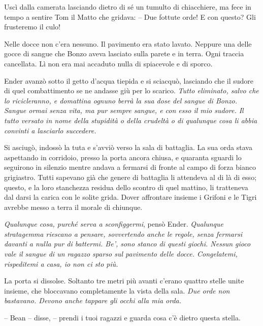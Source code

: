 {Uscì dalla camerata lasciando dietro di sé un tumulto di chiacchiere,
	ma fece in tempo a sentire Tom il Matto che gridava: -- Due fottute
	orde! E con questo? Gli frusteremo il culo!}

{Nelle docce non c'era nessuno. Il pavimento era stato lavato. Neppure
	una delle gocce di sangue che Bonzo aveva lasciato sulla parete e in
	terra. Ogni traccia cancellata. Lì non era mai accaduto nulla di
	spiacevole e di sporco.}

{Ender avanzò sotto il getto d'acqua tiepida e si sciacquò, lasciando
	che il sudore di quel combattimento se ne andasse giù per lo scarico.
	\emph{Tutto eliminato, salvo che lo ricicleranno, e domattina ognuno
		berrà la sua dose del sangue di Bonzo. Sangue ormai senza vita, ma pur
		sempre sangue, e con esso il mio sudore. Il tutto versato in nome della
		stupidità o della crudeltà o di qualunque cosa li abbia convinti a
		lasciarlo succedere.}}

{Si asciugò, indossò la tuta e s'avviò verso la sala di battaglia. La
	sua orda stava aspettando in corridoio, presso la porta ancora chiusa, e
	quaranta sguardi lo seguirono in silenzio mentre andava a fermarsi di
	fronte al campo di forza bianco grigiastro. Tutti sapevano già che
	genere di battaglia li attendeva al di là di esso; questo, e la loro
	stanchezza residua dello scontro di quel mattino, li tratteneva dal
	darsi la carica con le solite grida. Dover affrontare insieme i Grifoni
	e le Tigri avrebbe messo a terra il morale di chiunque.}

\emph{{Qualunque cosa, purché serva a sconfiggermi}}{, \emph{} pensò
	Ender. \emph{Qualunque stratagemma riescano a pensare, sovvertendo anche
		le regole, senza fermarsi davanti a nulla pur di battermi. Be', sono
		stanco di questi giochi. Nessun gioco vale il sangue di un ragazzo
		sparso sul pavimento delle docce. Congelatemi, rispeditemi a casa, io
		non ci sto più.}}

{La porta si dissolse. Soltanto tre metri più avanti c'erano quattro
	stelle unite insieme, che bloccavano completamente la vista della sala.
	\emph{Due orde non bastavano. Devono anche tappare gli occhi alla mia
		orda.}}

{-- Bean -- disse, -- prendi i tuoi ragazzi e guarda cosa c'è dietro
	questa stella.}

